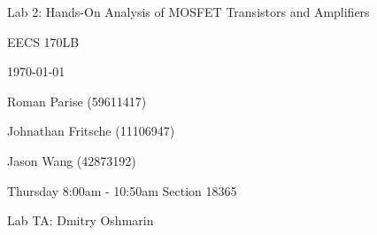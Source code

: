 \centering
\vspace{2.5cm}
{\huge Lab 2: Hands-On Analysis of MOSFET Transistors and Amplifiers \par}
{\Large EECS 170LB \par}
{\Large \today \par}
{\large Roman Parise (59611417) \par}
{\large Johnathan Fritsche (11106947) \par}
{\large Jason Wang (42873192) \par}
{\large \par}
{\large Thursday 8:00am - 10:50am Section 18365 \par}
{\large Lab TA: Dmitry Oshmarin \par}
\vspace{1cm}
\vspace{1cm}
